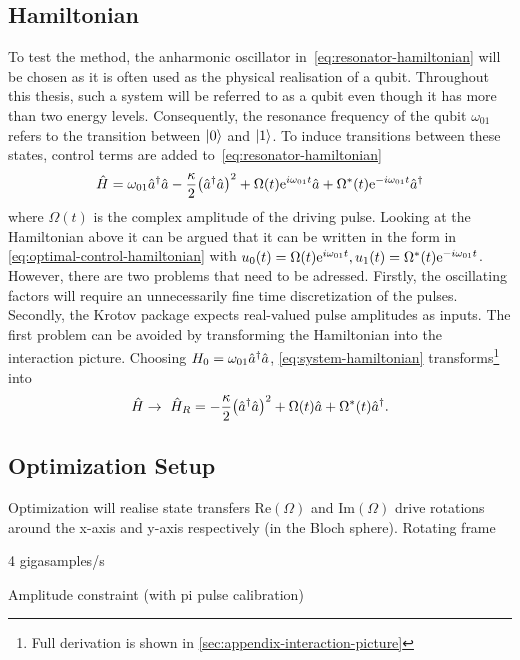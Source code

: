 \documentclass[main.tex]{subfiles}
\begin{document}
\subsection{Hamiltonian}
To test the method, the anharmonic oscillator in~\cref{eq:resonator-hamiltonian} will be chosen as it is often used as the physical realisation of a qubit.
Throughout this thesis, such a system will be referred to as a qubit even though it has more than two energy levels.
Consequently, the resonance frequency of the qubit \( \omega_{01} \) refers to the transition between \( \ket{0} \) and \( \ket{1} \).
To induce transitions between these states, control terms are added to~\cref{eq:resonator-hamiltonian}
\begin{equation}
    \hat{H} = \omega_{01} \hat{a}^\dagger\hat{a} - \frac{\kappa}{2} \qty(\hat{a}^\dagger\hat{a})^2 + \Omega(t)\mathrm{e}^{i\omega_{01}t}\hat{a} + \Omega^*(t)\mathrm{e}^{-i\omega_{01}t}\hat{a}^\dagger
    \label{eq:system-hamiltonian}
\end{equation}
where \( \Omega(t) \) is the complex amplitude of the driving pulse.
Looking at the Hamiltonian above it can be argued that it can be written in the form in \cref{eq:optimal-control-hamiltonian} with \( u_0(t) = \Omega(t)\mathrm{e}^{i\omega_{01}t}, u_1(t) = \Omega^*(t)\mathrm{e}^{-i\omega_{01}t} \).
However, there are two problems that need to be adressed.
Firstly, the oscillating factors will require an unnecessarily fine time discretization of the pulses.
Secondly, the Krotov package expects real-valued pulse amplitudes as inputs.
The first problem can be avoided by transforming the Hamiltonian into the interaction picture.
Choosing \( H_0 = \omega_{01} \hat{a}^\dagger\hat{a} \), \cref{eq:system-hamiltonian} transforms\footnote{Full derivation is shown in \cref{sec:appendix-interaction-picture}} into
\begin{equation}
    \hat{H} \rightarrow~ \hat{H}_R =  -\frac{\kappa}{2}\qty(\hat{a}^\dagger\hat{a})^2 + \Omega(t)\hat{a} + \Omega^*(t)\hat{a}^\dagger.
    \label{eq:system-hamiltonian-rotating}
\end{equation}


\subsection{Optimization Setup}
Optimization will realise state transfers
\(\text{Re}(\Omega)\) and \(\text{Im}(\Omega)\) drive rotations around the x-axis and y-axis respectively (in the Bloch sphere). 
Rotating frame

4 gigasamples/s

Amplitude constraint (with pi pulse calibration)
\end{document}

